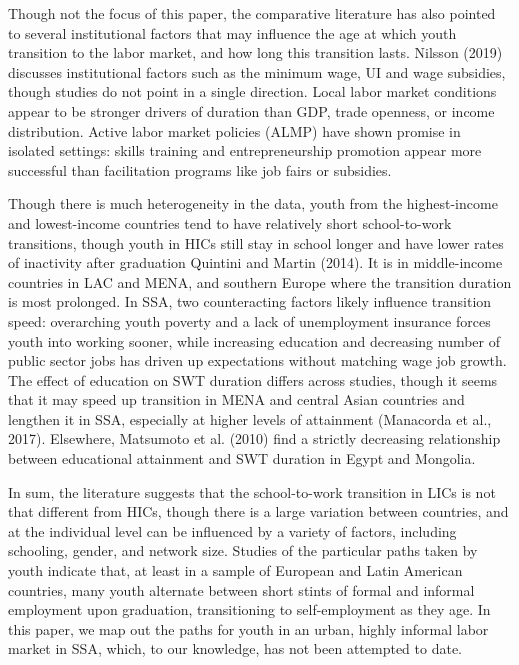 \documentclass[
  11pt,
a4paper
]{article}
\begin{document}
Though not the focus of this paper, the comparative literature has also pointed to several institutional factors that may influence the age at which youth transition to the labor market, and how long this transition lasts. Nilsson (2019) discusses institutional factors such as the minimum wage, UI and wage subsidies, though studies do not point in a single direction. Local labor market conditions appear to be stronger drivers of duration than GDP, trade openness, or income distribution. Active labor market policies (ALMP) have shown promise in isolated settings: skills training and entrepreneurship promotion appear more successful than facilitation programs like job fairs or subsidies.

Though there is much heterogeneity in the data, youth from the highest-income and lowest-income countries tend to have relatively short school-to-work transitions, though youth in HICs still stay in school longer and have lower rates of inactivity after graduation Quintini and Martin (2014). It is in middle-income countries in LAC and MENA, and southern Europe where the transition duration is most prolonged. In SSA, two counteracting factors likely influence transition speed: overarching youth poverty and a lack of unemployment insurance forces youth into working sooner, while increasing education and decreasing number of public sector jobs has driven up expectations without matching wage job growth. The effect of education on SWT duration differs across studies, though it seems that it may speed up transition in MENA and central Asian countries and lengthen it in SSA, especially at higher levels of attainment (Manacorda et al., 2017). Elsewhere, Matsumoto et al. (2010) find a strictly decreasing relationship between educational attainment and SWT duration in Egypt and Mongolia.

In sum, the literature suggests that the school-to-work transition in LICs is not that different from HICs, though there is a large variation between countries, and at the individual level can be influenced by a variety of factors, including schooling, gender, and network size. Studies of the particular paths taken by youth indicate that, at least in a sample of European and Latin American countries, many youth alternate between short stints of formal and informal employment upon graduation, transitioning to self-employment as they age. In this paper, we map out the paths for youth in an urban, highly informal labor market in SSA, which, to our knowledge, has not been attempted to date.
\end{document}
